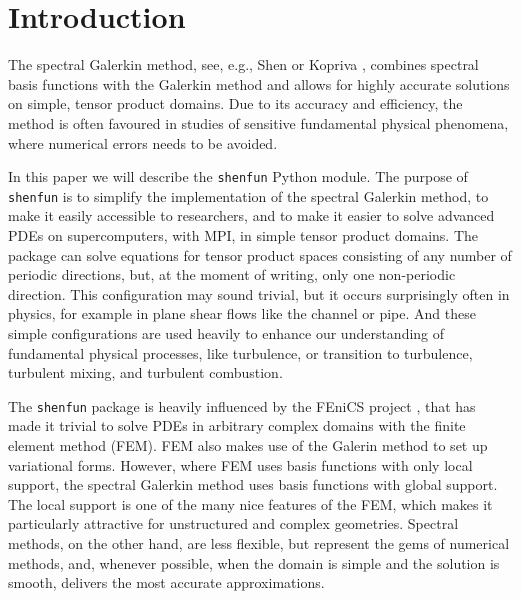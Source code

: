 \documentclass[%
oneside,                 %
final,                   %
10pt]{article}
\begin{document}
\tableofcontents


\vspace{1cm} %




    


\section{Introduction}
\label{sec:introduction}

The spectral Galerkin method, see, e.g., Shen \cite{shen95} or Kopriva \cite{kopriva09}, combines spectral basis functions with the Galerkin method and allows for highly accurate solutions on simple, tensor product domains. Due to its accuracy and efficiency, the method is often favoured in studies of sensitive fundamental physical phenomena, where numerical errors needs to be avoided. 

In this paper we will describe the \texttt{shenfun} Python module. The purpose of \texttt{shenfun} is to simplify the implementation of the spectral Galerkin method, to make it easily accessible to researchers, and to make it easier to solve advanced PDEs on supercomputers, with MPI, in simple tensor product domains. The package can solve equations for tensor product spaces consisting of any number of periodic directions, but, at the moment of writing, only one non-periodic direction. This configuration may sound trivial, but it occurs surprisingly often in physics, for example in plane shear flows like the channel or pipe. And these simple configurations are used heavily to enhance our understanding of fundamental physical processes, like turbulence, or transition to turbulence, turbulent mixing, and turbulent combustion.

The \texttt{shenfun} package is heavily influenced by the FEniCS project \cite{fenics}, that has made it trivial to solve PDEs in arbitrary complex domains with the finite element method (FEM). FEM also makes use of the Galerin method to set up variational forms. However, where FEM uses basis functions with only local support, the spectral Galerkin method uses basis functions with global support. The local support is one of the many nice features of the FEM, which makes it particularly attractive for unstructured and complex geometries. Spectral methods, on the other hand, are less flexible, but represent the gems of numerical methods, and, whenever possible, when the domain is simple and the solution is smooth, delivers the most accurate approximations.
\end{document}
